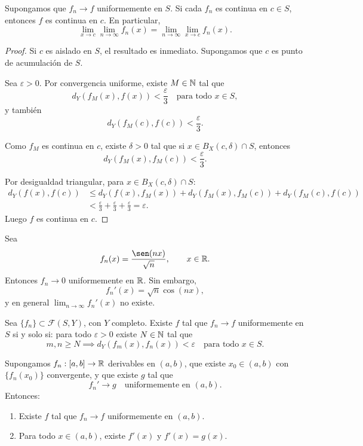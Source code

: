 \begin{teorema}
Supongamos que $f_n\to f$ uniformemente en $S$.
Si cada $f_n$ es continua en $c\in S$, entonces $f$ es continua en $c$.
En particular,
\[
\lim_{x\to c}\lim_{n\to\infty}f_n(x)=\lim_{n\to\infty}\lim_{x\to c}f_n(x).
\]
\end{teorema}

\begin{proof}
Si $c$ es aislado en $S$, el resultado es inmediato.
Supongamos que $c$ es punto de acumulación de $S$.

Sea $\varepsilon>0$. Por convergencia uniforme, existe $M\in\mathbb{N}$ tal que
\[
d_Y(f_M(x),f(x))<\frac{\varepsilon}{3}\quad \text{para todo }x\in S,
\]
y también
\[
d_Y(f_M(c),f(c))<\frac{\varepsilon}{3}.
\]

Como $f_M$ es continua en $c$, existe $\delta>0$ tal que si $x\in B_X(c,\delta)\cap S$, entonces
\[
d_Y(f_M(x),f_M(c))<\frac{\varepsilon}{3}.
\]

Por desigualdad triangular, para $x\in B_X(c,\delta)\cap S$:
\[
\begin{aligned}
d_Y(f(x),f(c))
&\le d_Y(f(x),f_M(x))+d_Y(f_M(x),f_M(c))+d_Y(f_M(c),f(c))\\
&<\frac{\varepsilon}{3}+\frac{\varepsilon}{3}+\frac{\varepsilon}{3}=\varepsilon.
\end{aligned}
\]
Luego $f$ es continua en $c$.
\end{proof}

\begin{example}
Sea
\[
f_n(x)=\frac{\sen(nx)}{\sqrt{n}},\qquad x\in\R.
\]
Entonces $f_n\to 0$ uniformemente en $\mathbb{R}$.
Sin embargo,
\[
f_n'(x)=\sqrt{n}\cos(nx),
\]
y en general $\lim_{n\to\infty}f_n'(x)$ no existe.
\end{example}

\begin{teorema}
Sea $\{f_n\}\subset \mathcal{F}(S,Y)$, con $Y$ completo.
Existe $f$ tal que $f_n\to f$ uniformemente en $S$ si y solo si:
para todo $\varepsilon>0$ existe $N\in\mathbb{N}$ tal que
\[
m,n\ge N \implies d_Y(f_m(x),f_n(x))<\varepsilon\quad \text{para todo }x\in S.
\]
\end{teorema}

\begin{teorema}
Supongamos $f_n:[a,b]\to\mathbb{R}$ derivables en $(a,b)$, que existe $x_0\in(a,b)$ con $\{f_n(x_0)\}$ convergente, y que existe $g$ tal que
\[
f_n'\to g \quad \text{uniformemente en }(a,b).
\]
Entonces:
\begin{enumerate}
    \item Existe $f$ tal que $f_n\to f$ uniformemente en $(a,b)$.
    \item Para todo $x\in(a,b)$, existe $f'(x)$ y $f'(x)=g(x)$.
\end{enumerate}
\end{teorema}

